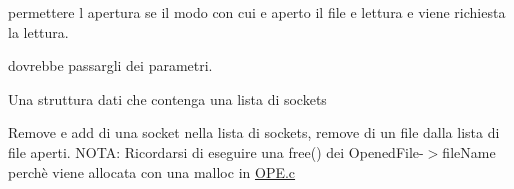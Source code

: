 \begin{DoxyRefList}
permettere l\textquotesingle{} apertura se il modo con cui e\textquotesingle{} aperto il file e\textquotesingle{} lettura e viene richiesta la lettura.  
\item[\label{todo__todo000007}%
\hypertarget{todo__todo000007}{}%
global\+Scope$>$ Globale \hyperlink{server_8c_a5e7b14672f9e2c9fa99b363004afb8e8}{spawn\+Thread} ()]dovrebbe passargli dei parametri.  
\item[\label{todo__todo000008}%
\hypertarget{todo__todo000008}{}%
File \hyperlink{StruttureDati_8c}{Strutture\+Dati.c} ]Una struttura dati che contenga una lista di sockets 

Remove e add di una socket nella lista di sockets, remove di un file dalla lista di file aperti. N\+O\+T\+A\+: Ricordarsi di eseguire una free() dei Opened\+File-\/$>$file\+Name perchè viene allocata con una malloc in \hyperlink{OPE_8c}{O\+P\+E.\+c}
\end{DoxyRefList}